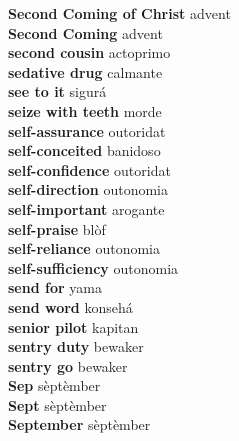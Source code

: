 \textbf{ Second Coming of Christ  } advent \\
\textbf{ Second Coming  } advent \\
\textbf{ second cousin  } actoprimo \\
\textbf{ sedative drug  } calmante \\
\textbf{ see to it  } sigurá \\
\textbf{ seize with teeth  } morde \\
\textbf{ self-assurance  } outoridat \\
\textbf{ self-conceited  } banidoso \\
\textbf{ self-confidence  } outoridat \\
\textbf{ self-direction  } outonomia \\
\textbf{ self-important  } arogante \\
\textbf{ self-praise  } blòf \\
\textbf{ self-reliance  } outonomia \\
\textbf{ self-sufficiency  } outonomia \\
\textbf{ send for  } yama \\
\textbf{ send word  } konsehá \\
\textbf{ senior pilot  } kapitan \\
\textbf{ sentry duty  } bewaker \\
\textbf{ sentry go  } bewaker \\
\textbf{ Sep  } sèptèmber \\
\textbf{ Sept  } sèptèmber \\
\textbf{ September  } sèptèmber \\

